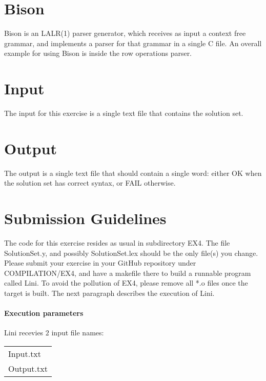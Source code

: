 \documentclass{article}
\begin{document}
\section{Bison}
Bison is an LALR(1) parser generator, which receives as input a context free grammar,
and implements a parser for that grammar in a single C file.
An overall example for using Bison is inside the row operations parser.

\section{Input}
The input for this exercise is a single text file that contains the solution set.

\section{Output}
The output is a single text file that should contain a single word:
either OK when the solution set has correct syntax, or FAIL otherwise.

\section{Submission Guidelines}
The code for this exercise resides as usual in subdirectory EX4.
The file SolutionSet.y, and possibly SolutionSet.lex should be the only file(s) you change.
Please submit your exercise in your GitHub repository under COMPILATION/EX4,
and have a makefile there to build a runnable program called Lini.
To avoid the pollution of EX4, please remove all *.o files once the target is built.
The next paragraph describes the execution of Lini.

\paragraph{Execution parameters}
Lini recevies $2$ input file names:
\begin{table}[h]
\centering
\begin{tabular}{ l }
  Input.txt  \\
  Output.txt \\
\end{tabular}
\end{table}
\end{document}
